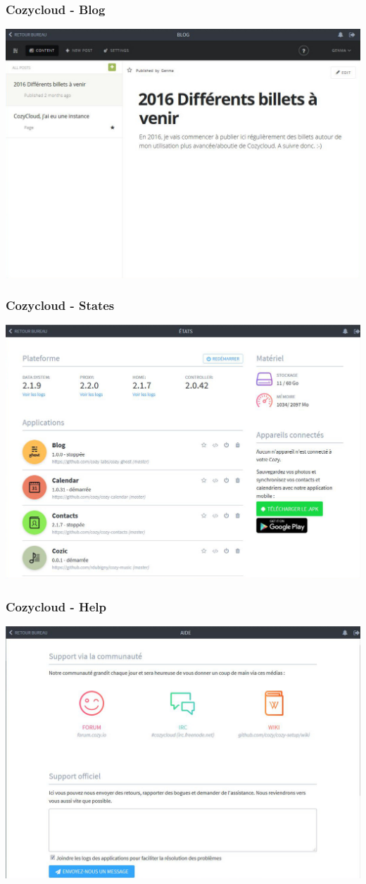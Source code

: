 \documentclass{beamer}
\begin{document}
\begin{frame}
\frametitle{Cozycloud - Blog}
\includegraphics[scale=0.3] {./CozyCloud/CozyCloud_Blog.jpg}
\end{frame}

\begin{frame}
\frametitle{Cozycloud - States}
\includegraphics[scale=0.3] {./CozyCloud/CozyCloud_Etats.jpg}
\end{frame}

\begin{frame}
\frametitle{Cozycloud - Help}
\includegraphics[scale=0.3] {./CozyCloud/CozyCloud_Aide.jpg}
\end{frame}
\end{document}

